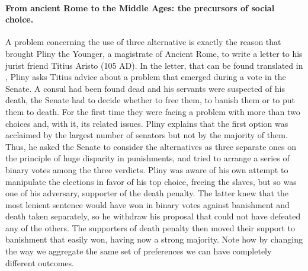 \paragraph{From ancient Rome to the Middle Ages: the precursors of social choice.}
A problem concerning the use of three alternative is exactly the reason that brought Pliny the Younger, a magistrate of Ancient Rome, to write a letter to his jurist friend Titius Aristo (105 AD). In the letter, that can be found translated in \citet[Chapter 2]{McLeanUrken1995}, Pliny asks Titius advice about a problem that emerged during a vote in the Senate. 
A consul had been found dead and his servants were suspected of his death, the Senate had to decide whether to free them, to banish them or to put them to death. For the first time they were facing a problem with more than two choices and, with it, its related issues.
Pliny explains that the first option was acclaimed by the largest number of senators but not by the majority of them. Thus, he asked the Senate to consider the alternatives as three separate ones on the principle of huge disparity in punishments, and tried to arrange a series of binary votes among the three verdicts.
Pliny was aware of his own attempt to manipulate the elections in favor of his top choice, freeing the slaves, but so was one of his adversary, supporter of the death penalty.
The latter knew that the most lenient sentence would have won in binary votes against banishment and death taken separately, so he withdraw his proposal that could not have defeated any of the others.
The supporters of death penalty then moved their support to banishment that easily won, having now a strong majority. Note how by changing the way we aggregate the same set of preferences we can have completely different outcomes.


